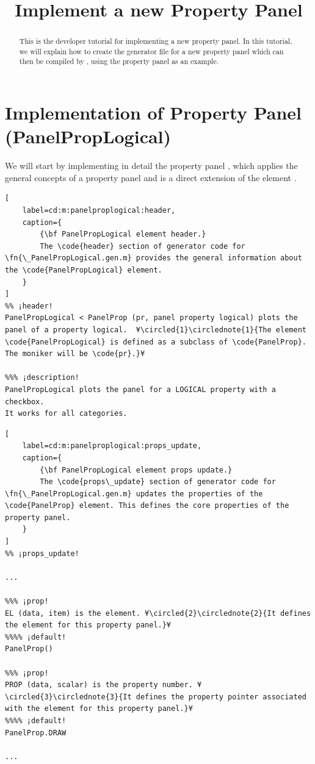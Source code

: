 \documentclass{tufte-handout}
\title{Implement a new Property Panel}
\begin{document}
\maketitle

\begin{abstract}
\noindent
This is the developer tutorial for implementing a new property panel. 
In this tutorial, we will explain how to create the generator file  for a new property panel which can then be compiled by , using the property panel  as an example.
\end{abstract}

\tableofcontents

\clearpage
\section{Implementation of Property Panel (PanelPropLogical)}


We will start by implementing in detail the property panel , which applies the general concepts of a property panel and is a direct extension of the element .

\begin{lstlisting}[
	label=cd:m:panelproplogical:header,
	caption={
		{\bf PanelPropLogical element header.}
		The \code{header} section of generator code for \fn{\_PanelPropLogical.gen.m} provides the general information about the \code{PanelPropLogical} element.
	}
]
%% ¡header!
PanelPropLogical < PanelProp (pr, panel property logical) plots the panel of a property logical.  ¥\circled{1}\circlednote{1}{The element \code{PanelPropLogical} is defined as a subclass of \code{PanelProp}. The moniker will be \code{pr}.}¥

%%% ¡description!
PanelPropLogical plots the panel for a LOGICAL property with a checkbox.
It works for all categories.

\end{lstlisting}

\begin{lstlisting}[
	label=cd:m:panelproplogical:props_update,
	caption={
		{\bf PanelPropLogical element props update.}
		The \code{props\_update} section of generator code for \fn{\_PanelPropLogical.gen.m} updates the properties of the \code{PanelProp} element. This defines the core properties of the property panel.
	}
]
%% ¡props_update!

...

%%% ¡prop!
EL (data, item) is the element. ¥\circled{2}\circlednote{2}{It defines the element for this property panel.}¥
%%%% ¡default!
PanelProp()

%%% ¡prop!
PROP (data, scalar) is the property number. ¥\circled{3}\circlednote{3}{It defines the property pointer associated with the element for this property panel.}¥
%%%% ¡default!
PanelProp.DRAW

...

\end{lstlisting}
\end{document}
